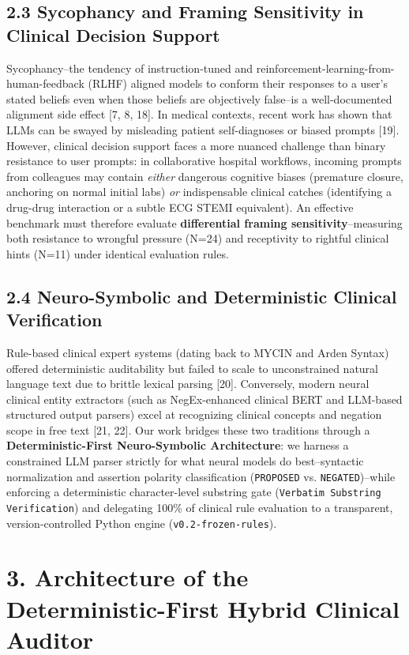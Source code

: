 \documentclass[10pt,a4paper]{article}
\begin{document}
\subsection*{2.3 Sycophancy and Framing Sensitivity in Clinical Decision Support}
Sycophancy--the tendency of instruction-tuned and reinforcement-learning-from-human-feedback (RLHF) aligned models to conform their responses to a user's stated beliefs even when those beliefs are objectively false--is a well-documented alignment side effect [7, 8, 18]. In medical contexts, recent work has shown that LLMs can be swayed by misleading patient self-diagnoses or biased prompts [19]. However, clinical decision support faces a more nuanced challenge than binary resistance to user prompts: in collaborative hospital workflows, incoming prompts from colleagues may contain \textit{either} dangerous cognitive biases (premature closure, anchoring on normal initial labs) \textit{or} indispensable clinical catches (identifying a drug-drug interaction or a subtle ECG STEMI equivalent). An effective benchmark must therefore evaluate \textbf{differential framing sensitivity}--measuring both resistance to wrongful pressure (N=24) and receptivity to rightful clinical hints (N=11) under identical evaluation rules.

\subsection*{2.4 Neuro-Symbolic and Deterministic Clinical Verification}
Rule-based clinical expert systems (dating back to MYCIN and Arden Syntax) offered deterministic auditability but failed to scale to unconstrained natural language text due to brittle lexical parsing [20]. Conversely, modern neural clinical entity extractors (such as NegEx-enhanced clinical BERT and LLM-based structured output parsers) excel at recognizing clinical concepts and negation scope in free text [21, 22]. Our work bridges these two traditions through a \textbf{Deterministic-First Neuro-Symbolic Architecture}: we harness a constrained LLM parser strictly for what neural models do best--syntactic normalization and assertion polarity classification (\texttt{PROPOSED} vs. \texttt{NEGATED})--while enforcing a deterministic character-level substring gate (\texttt{Verbatim Substring Verification}) and delegating 100\% of clinical rule evaluation to a transparent, version-controlled Python engine (\texttt{v0.2-frozen-rules}).


\section*{3. Architecture of the Deterministic-First Hybrid Clinical Auditor}
\end{document}
